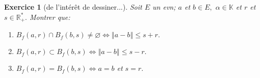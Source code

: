 \documentclass[12pt,a4paper]{article}
\theoremstyle{break}
\theoremstyle{break}
\newtheorem{Exo}{Exercice}
\begin{document}
 \begin{Exo}[de l'intérêt de dessiner...]
	Soit $E$ un evn; $a$ et $b\in E,$ $\alpha \in \mathbb{K}$ et $r$ et $%
	s\in \mathbb{R}_{+}^{\ast }.$ Montrer que:
	
	\begin{enumerate}
		
		
		\item $B_f\left( a,r\right) \cap B_f\left( b,s\right) \neq
		\varnothing \iff \left\Vert a-b\right\Vert \leqslant s+r.$
		
		\item $B_f\left( a,r\right) \subset B_f\left( b,s\right)
		\iff \left\Vert a-b\right\Vert \leqslant s-r.$
		
		\item $B_f\left( a,r\right) =B_f\left( b,s\right)
		\iff a=b$ et $s=r.$
		
		
	\end{enumerate}
\end{Exo}
\end{document}
